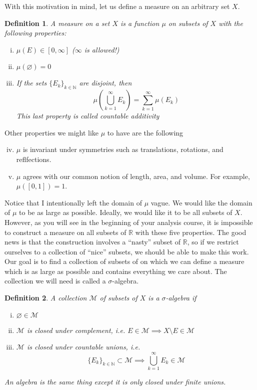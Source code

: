 \documentclass[12pt]{amsart}         %
\newtheorem{definition}{Definition}[section]
\theoremstyle{remark}
\newcommand{\N}{\mathbb{N}}
\newcommand{\R}{\mathbb{R}}
\begin{document}
With this motivation in mind, let us define a measure on an arbitrary set $X$.

\begin{definition}A \emph{measure} on a set $X$ is a function $\mu$ on subsets of $X$ with the following properties:
\begin{enumerate}[(i)]
\item $\mu(E) \in [0, \infty]$ ($\infty$ is allowed!)
\item $\mu(\varnothing) = 0$
\item If the sets $\{E_k\}_{k \in \N}$ are disjoint, then 
	\begin{equation}
	\mu \left( \bigcup_{k=1}^\infty E_k \right) = \sum_{k=1}^\infty \mu(E_k)
	\end{equation}
	This last property is called \emph{countable additivity}
\end{enumerate}
\end{definition}

Other properties we might like $\mu$ to have are the following
\begin{enumerate}[(i)]\setcounter{enumi}{3}
\item $\mu$ is invariant under symmetries such as translations, rotations, and reflfections.
\item $\mu$ agrees with our common notion of length, area, and volume. For example, $\mu([0,1]) = 1$.
\end{enumerate}

Notice that I intentionally left the domain of $\mu$ vague. We would like the domain of $\mu$ to be as large as possible. Ideally, we would like it to be all subsets of $X$. However, as you will see in the beginning of your analysis course, it is impossible to construct a measure on all subsets of $\R$ with these five properties. The good news is that the construction involves a ``nasty'' subset of $\R$, so if we restrict ourselves to a collection of ``nice'' subsets, we should be able to make this work. Our goal is to find a collection of subsets of on which we can define a measure which is as large as possible and contains everything we care about. The collection we will need is called a $\sigma$-algebra.

\begin{definition}A collection $\mathcal{M}$ of subsets of $X$ is a \emph{$\sigma$-algebra} if 
\begin{enumerate}[(i)]
	\item $\varnothing \in \mathcal{M}$ 
	\item $\mathcal{M}$ is closed under complement, i.e. $E \in \mathcal{M} \implies X\setminus E \in \mathcal{M}$
	\item $\mathcal{M}$ is closed under countable unions, i.e. 
	\[
	\{E_k\}_{k \in \N} \subset \mathcal{M} \implies \bigcup_{k=1}^\infty E_k \in \mathcal{M} 
	\]
\end{enumerate}
An \emph{algebra} is the same thing except it is only closed under finite unions.
\end{definition}
\end{document}
